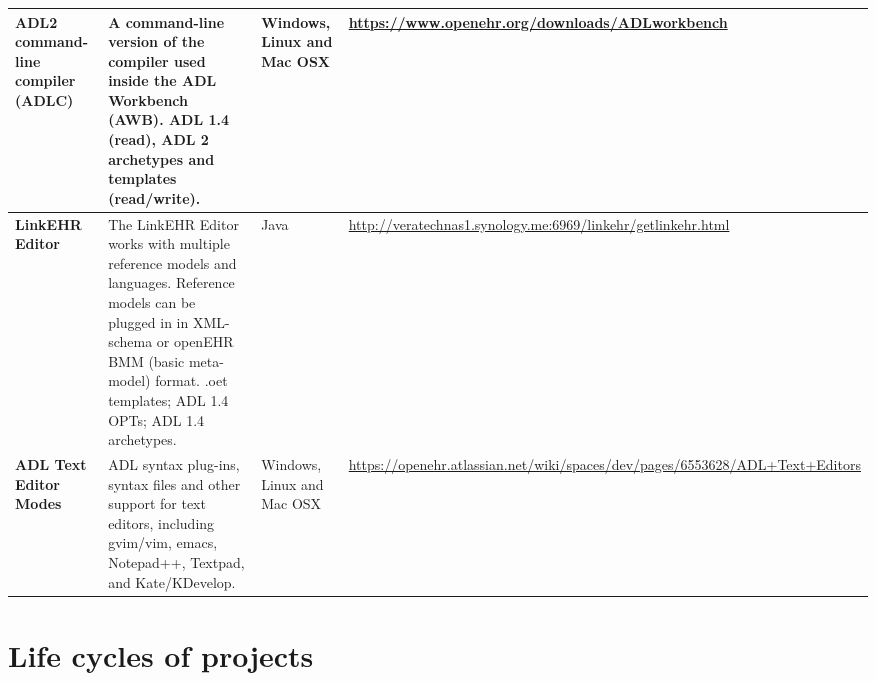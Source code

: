 \documentclass[mim_thesis.tex]{subfiles}
\begin{document}
\begin{table}[H]
\begin{tabular}{p{3.5cm} p{5cm} p{2cm} p{4cm}}
\textbf{ADL2 command-line compiler (ADLC)} & A command-line version of the compiler used inside the ADL Workbench (AWB). ADL 1.4 (read), ADL 2 archetypes and templates (read/write).                                                                                                                                                                                                & Windows, Linux and Mac OSX & \url{https://www.openehr.org/downloads/ADLworkbench}                                                            \\ \midrule
\textbf{LinkEHR Editor}                    & The LinkEHR Editor works with multiple reference models and languages. Reference models can be plugged in in XML-schema or openEHR BMM (basic meta-model) format. .oet templates; ADL 1.4 OPTs; ADL 1.4 archetypes.                                                                                                                     & Java                       & \url{http://veratechnas1.synology.me:6969/linkehr/getlinkehr.html}                                              \\ \midrule
\textbf{ADL Text Editor Modes}             & ADL syntax plug-ins, syntax files and other support for text editors, including gvim/vim, emacs, Notepad++, Textpad, and Kate/KDevelop.                                                                                                                                                                                                 & Windows, Linux and Mac OSX & \url{https://openehr.atlassian.net/wiki/spaces/dev/pages/6553628/ADL+Text+Editors}                              \\ \bottomrule[2pt]
\end{tabular}
\end{table}


\section{Life cycles of projects}
\end{document}
